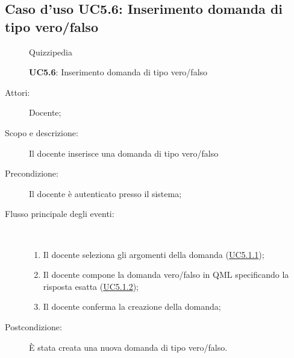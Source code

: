 \subsection{Caso d'uso UC5.6: Inserimento domanda di tipo vero/falso}
	\begin{figure}[H]
		\centering
		\begin{resizedtikzpicture}{\textwidth}
		\begin{umlsystem}[x=0, fill=lightgray!20]{Quizzipedia}
		\end{umlsystem}
		\end{resizedtikzpicture}
		\caption{\textbf{UC5.6}: Inserimento domanda di tipo vero/falso}
		\label{UC5.6}
	\end{figure}
\begin{description}
\item[Attori:] Docente;
\item[Scopo e descrizione:] Il docente inserisce una domanda di tipo vero/falso
      \item[Precondizione:] Il docente è autenticato presso il sistema;

        \item[Flusso principale degli eventi:] \ 
 \begin{enumerate}
          \item Il docente seleziona gli argomenti della domanda (\hyperlink{UC5.1.1}{UC5.1.1});
          \item Il docente compone la domanda vero/falso in QML specificando la risposta esatta (\hyperlink{UC5.1.2}{UC5.1.2});
          \item Il docente conferma la creazione della domanda;

      \end{enumerate}
    \item[Postcondizione:] È stata creata una nuova domanda di tipo vero/falso.
  \end{description}
\hypertarget{UC5.7}{}
